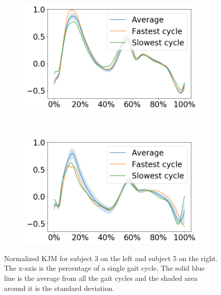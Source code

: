 \begin{figure}[ht!]
     \centering
     \begin{subfigure}[b]{0.328\textwidth}
         \centering
         \includegraphics[width=\textwidth]{img/results/moment_avg/subject03_all_set1_moment_avg_w_minmax.png}
     \end{subfigure}
     ~
     \begin{subfigure}[b]{0.328\textwidth}
         \centering
         \includegraphics[width=\textwidth]{img/results/moment_avg/subject05_all_set1_moment_avg_w_minmax.png}
     \end{subfigure}
    \caption{Normalized \ac{KJM} for subject 3 on the left and subject 5 on the right. The x-axis is the percentage of a single gait cycle. The solid blue line is the average from all the gait cycles and the shaded area around it is the standard deviation.}
    \label{fig:A-kjm-average}
\end{figure}
